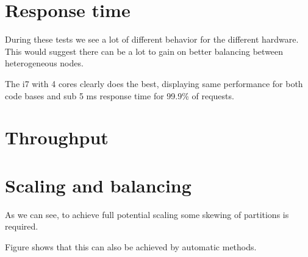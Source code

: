 \section{Response time}
During these tests we see a lot of different behavior for the different hardware. This would suggest there can be a lot to gain on better balancing between heterogeneous nodes.


The i7 with 4 cores clearly does the best, displaying same performance for both code bases and sub 5 ms response time for 99.9\% of requests.

\section{Throughput}
\label{eval:throughput}

\section{Scaling and balancing}
\label{eval:balance}
As we can see, to achieve full potential scaling some skewing of partitions is required.

Figure shows that this can also be achieved by automatic methods.

